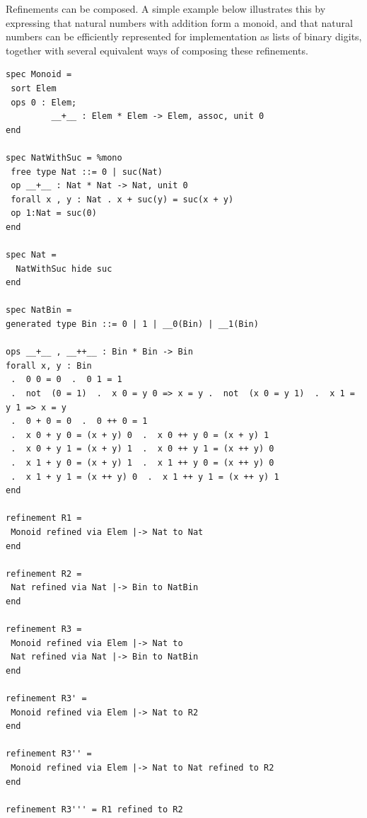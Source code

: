 \documentclass[10pt,fleqn,final]{scrreprt}
\begin{document}
\medskip

Refinements can be composed. A simple example below illustrates this
by expressing that natural numbers with addition form a monoid, and
that natural numbers can be efficiently represented for implementation
as lists of binary digits, together with several equivalent ways of
composing these refinements.

\begin{lstlisting}[basicstyle=\ttfamily\footnotesize,language=dolText,alsolanguage=CASL,escapechar=@,mathescape]	
spec Monoid =
 sort Elem
 ops 0 : Elem;
         __+__ : Elem * Elem -> Elem, assoc, unit 0
end

spec NatWithSuc = %mono
 free type Nat ::= 0 | suc(Nat)
 op __+__ : Nat * Nat -> Nat, unit 0 
 forall x , y : Nat . x + suc(y) = suc(x + y)
 op 1:Nat = suc(0)
end

spec Nat =
  NatWithSuc hide suc
end

spec NatBin =
generated type Bin ::= 0 | 1 | __0(Bin) | __1(Bin)

ops __+__ , __++__ : Bin * Bin -> Bin 
forall x, y : Bin 
 .  0 0 = 0  .  0 1 = 1
 .  not  (0 = 1)  .  x 0 = y 0 => x = y .  not  (x 0 = y 1)  .  x 1 = y 1 => x = y
 .  0 + 0 = 0  .  0 ++ 0 = 1 
 .  x 0 + y 0 = (x + y) 0  .  x 0 ++ y 0 = (x + y) 1
 .  x 0 + y 1 = (x + y) 1  .  x 0 ++ y 1 = (x ++ y) 0 
 .  x 1 + y 0 = (x + y) 1  .  x 1 ++ y 0 = (x ++ y) 0
 .  x 1 + y 1 = (x ++ y) 0  .  x 1 ++ y 1 = (x ++ y) 1 
end

refinement R1 =
 Monoid refined via Elem |-> Nat to Nat
end

refinement R2 =
 Nat refined via Nat |-> Bin to NatBin
end

refinement R3 =
 Monoid refined via Elem |-> Nat to
 Nat refined via Nat |-> Bin to NatBin
end

refinement R3' =
 Monoid refined via Elem |-> Nat to R2
end

refinement R3'' = 
 Monoid refined via Elem |-> Nat to Nat refined to R2
end

refinement R3''' = R1 refined to R2

\end{lstlisting}
\end{document}
